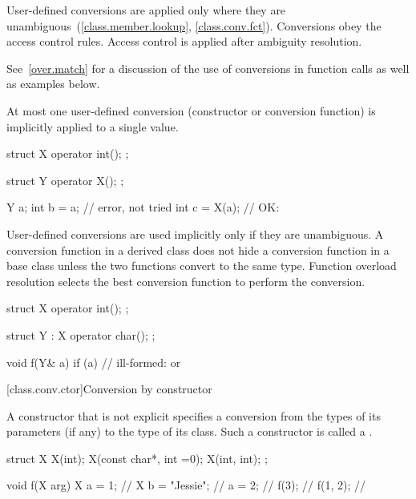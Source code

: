 \pnum
User-defined conversions are applied only where they are unambiguous~(\ref{class.member.lookup}, \ref{class.conv.fct}).
Conversions obey the access control rules.
Access control is applied after ambiguity resolution.

\pnum
\begin{note}
See~\ref{over.match} for a discussion of the use of conversions in function calls
as well as examples below.
\end{note}

\pnum
{}%
At most one user-defined conversion (constructor or conversion function)
is implicitly applied to a single value.
\begin{example}
\begin{codeblock}
struct X {
  operator int();
};

struct Y {
  operator X();
};

Y a;
int b = a;          // error,  not tried
int c = X(a);       // OK: 
\end{codeblock}
\end{example}

\pnum
User-defined conversions are used implicitly only if they are unambiguous.
%
A conversion function in a derived class does not hide a conversion function
in a base class unless the two functions convert to the same type.
Function overload resolution selects the best
conversion function to perform the conversion.
\begin{example}
\begin{codeblock}
struct X {
  operator int();
};

struct Y : X {
    operator char();
};

void f(Y& a) {
  if (a) {          // ill-formed:  or 
  }
}
\end{codeblock}
\end{example}

[class.conv.ctor]{Conversion by constructor}%
%

\pnum
A constructor that is not explicit
specifies a conversion from
the types of its parameters (if any)
to the type of its class.
Such a constructor is called a
.
\begin{example}

%
\begin{codeblock}
struct X {
    X(int);
    X(const char*, int =0);
    X(int, int);
};

void f(X arg) {
  X a = 1;          // 
  X b = "Jessie";   // 
  a = 2;            // 
  f(3);             // 
  f({1, 2});        // 
}
\end{codeblock}
\end{example}

